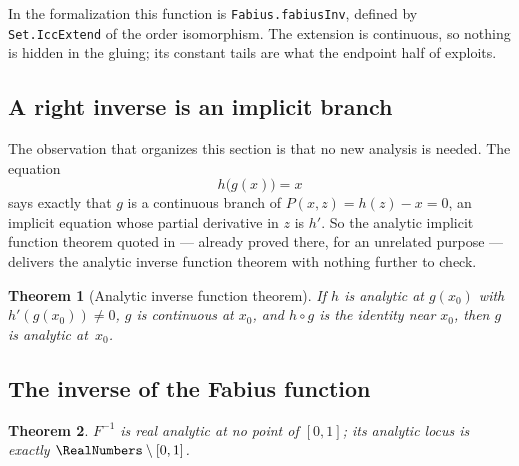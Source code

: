 \documentclass[11pt,oneside]{article}
\newtheorem{theorem}{Theorem}[section]
\theoremstyle{definition}
\theoremstyle{remark}
\begin{document}
In the formalization this function is \texttt{Fabius.fabiusInv}, defined by
\texttt{Set.IccExtend} of the order isomorphism.  The extension is continuous,
so nothing is hidden in the gluing; its constant tails are what the endpoint
half of  exploits.

\subsection{A right inverse is an implicit branch}

The observation that organizes this section is that no new analysis is
needed.  The equation
\[
  h\bigl(g(x)\bigr)=x
\]
says exactly that $g$ is a continuous branch of $P(x,z)=h(z)-x=0$, an implicit
equation whose partial derivative in $z$ is $h'$.  So the analytic implicit
function theorem quoted in  --- already proved there, for
an unrelated purpose --- delivers the analytic inverse function theorem with
nothing further to check.

\begin{theorem}[Analytic inverse function theorem]\label{thm:ift}
If $h$ is analytic at $g(x_0)$ with $h'(g(x_0))\ne0$, $g$ is continuous at
$x_0$, and $h\circ g$ is the identity near $x_0$, then $g$ is analytic
at~$x_0$.
\end{theorem}

\subsection{The inverse of the Fabius function}

\begin{theorem}\label{thm:invnowhere}
$F^{-1}$ is real analytic at no point of $[0,1]$; its analytic locus is
exactly $\RealNumbers\setminus[0,1]$.
\end{theorem}
\end{document}
